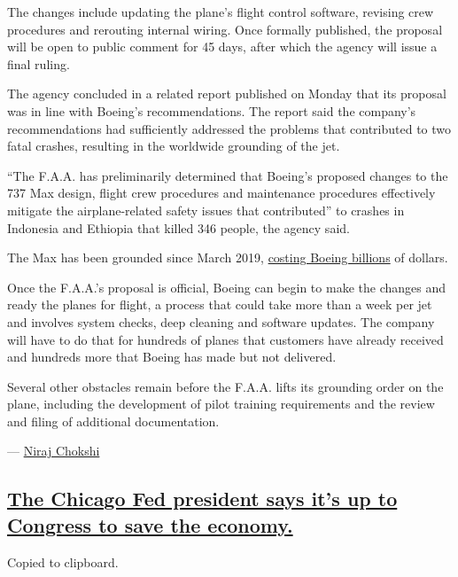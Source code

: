 The changes include updating the plane's flight control software,
revising crew procedures and rerouting internal wiring. Once formally
published, the proposal will be open to public comment for 45 days,
after which the agency will issue a final ruling.

The agency concluded in a related report published on Monday that its
proposal was in line with Boeing's recommendations. The report said the
company's recommendations had sufficiently addressed the problems that
contributed to two fatal crashes, resulting in the worldwide grounding
of the jet.

``The F.A.A. has preliminarily determined that Boeing's proposed changes
to the 737 Max design, flight crew procedures and maintenance procedures
effectively mitigate the airplane-related safety issues that
contributed'' to crashes in Indonesia and Ethiopia that killed 346
people, the agency said.

The Max has been grounded since March 2019,
\href{https://www.nytimes.com/2020/01/29/business/boeing-737-max-costs.html}{costing
Boeing billions} of dollars.

Once the F.A.A.'s proposal is official, Boeing can begin to make the
changes and ready the planes for flight, a process that could take more
than a week per jet and involves system checks, deep cleaning and
software updates. The company will have to do that for hundreds of
planes that customers have already received and hundreds more that
Boeing has made but not delivered.

Several other obstacles remain before the F.A.A. lifts its grounding
order on the plane, including the development of pilot training
requirements and the review and filing of additional documentation.

--- \href{https://www.nytimes.com/by/niraj-chokshi}{Niraj Chokshi}

\hypertarget{the-chicago-fed-president-says-its-up-to-congress-to-save-the-economy}{%
\subsection{\texorpdfstring{\protect\hyperlink{the-chicago-fed-president-says-its-up-to-congress-to-save-the-economy}{The
Chicago Fed president says it's up to Congress to save the
economy.}}{The Chicago Fed president says it's up to Congress to save the economy.}}\label{the-chicago-fed-president-says-its-up-to-congress-to-save-the-economy}}

Copied to clipboard.

